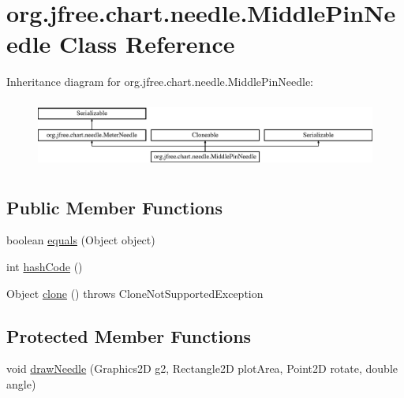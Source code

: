 \hypertarget{classorg_1_1jfree_1_1chart_1_1needle_1_1_middle_pin_needle}{}\section{org.\+jfree.\+chart.\+needle.\+Middle\+Pin\+Needle Class Reference}
\label{classorg_1_1jfree_1_1chart_1_1needle_1_1_middle_pin_needle}
Inheritance diagram for org.\+jfree.\+chart.\+needle.\+Middle\+Pin\+Needle\+:\begin{figure}[H]
\begin{center}
\leavevmode
\includegraphics[height=2.295082cm]{classorg_1_1jfree_1_1chart_1_1needle_1_1_middle_pin_needle}
\end{center}
\end{figure}
\subsection*{Public Member Functions}
\begin{DoxyCompactItemize}
\item 
boolean \mbox{\hyperlink{classorg_1_1jfree_1_1chart_1_1needle_1_1_middle_pin_needle_a811858638862384df067065a692d2f94}{equals}} (Object object)
\item 
int \mbox{\hyperlink{classorg_1_1jfree_1_1chart_1_1needle_1_1_middle_pin_needle_aa4eff1a5ac8921b2eb17186244c91a5f}{hash\+Code}} ()
\item 
Object \mbox{\hyperlink{classorg_1_1jfree_1_1chart_1_1needle_1_1_middle_pin_needle_a22c0066ff1fe4f240a900ad586862e06}{clone}} ()  throws Clone\+Not\+Supported\+Exception 
\end{DoxyCompactItemize}
\subsection*{Protected Member Functions}
\begin{DoxyCompactItemize}
\item 
void \mbox{\hyperlink{classorg_1_1jfree_1_1chart_1_1needle_1_1_middle_pin_needle_a6f4ced6c2fca114c06dbf10e91a7e235}{draw\+Needle}} (Graphics2D g2, Rectangle2D plot\+Area, Point2D rotate, double angle)
\end{DoxyCompactItemize}
